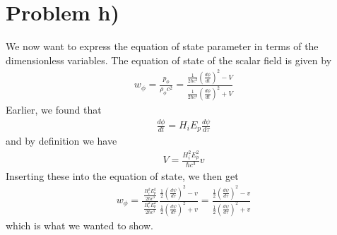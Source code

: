 \documentclass[reprint,english,notitlepage]{revtex4-1}  %
\numberwithin{equation}{section}
\begin{document}
\section{Problem h)}
We now want to express the equation of state parameter in terms of the
dimensionless variables. The equation of state of the scalar field is given by
\begin{align}
 w_\phi =	\frac{p_\phi}{\rho_\phi c^2}
	= \frac{ \frac{1}{2\hbar c^3}\left(\frac{d\phi}{dt}\right)^2 - V }
				 { \frac{1}{2\hbar c^3}\left(\frac{d\phi}{dt}\right)^2 + V }
\end{align}
Earlier, we found that
\begin{align}
	\frac{d\phi}{dt} = H_i E_p \frac{d\psi}{d\tau}
\end{align}
and by definition we have
\begin{align}
	V = \frac{H_i^2 E_p^2}{\hbar c^3} v
\end{align}
Inserting these into the equation of state, we then get
\begin{align}
	w_\phi
	 = \frac{\ \frac{H_i^2E_p^2}{2\hbar c^3} \ }{\frac{H_i^2E_p^2}{2\hbar c^3}}
	 \frac{ \frac{1}{2}\left(\frac{d\psi}{d\tau}\right)^2 - v }
					{ \frac{1}{2}\left(\frac{d\psi}{d\tau}\right)^2	+ v }
	 = \frac{ \frac{1}{2}\left(\frac{d\psi}{d\tau}\right)^2 - v }
 				 { \frac{1}{2}\left(\frac{d\psi}{d\tau}\right)^2 + v }
\end{align}
which is what we wanted to show.
\end{document}
